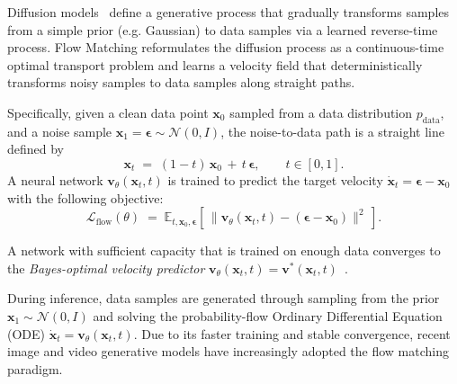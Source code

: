 Diffusion models~\citep{ho2020denoising,song2021score} define a generative process that gradually transforms samples from a simple prior (e.g. Gaussian) to data samples via a learned reverse-time process. Flow Matching \cite{liu2022rectified,lipman2023flow} reformulates the diffusion process as a continuous-time optimal transport problem and learns a velocity field that deterministically transforms noisy samples to data samples along straight paths.

Specifically, given a clean data point $\mathbf{x}_0$ sampled from a data distribution $p_{\text{data}}$, and a noise sample $\mathbf{x}_1 = \boldsymbol{\epsilon} \sim \mathcal{N}(0, I)$, the noise-to-data path is a straight line defined by
\begin{equation}
  \mathbf{x}_t \;=\; (1-t)\, \mathbf{x}_0 \,+\, t\,\boldsymbol{\epsilon},
  \qquad t \in [0, 1].
  \label{eq:flow-forward}
\end{equation}
A neural network
$\mathbf{v}_\theta(\mathbf{x}_t, t)$ is trained to predict the target velocity $\dot{\mathbf{x}}_t = \boldsymbol{\epsilon} - \mathbf{x}_0$ with the following objective:
\begin{equation}
  \mathcal{L}_\text{flow}(\theta) \;=\; \mathbb{E}_{t, \mathbf{x}_0, \boldsymbol{\epsilon}}\!\left[\,\|\mathbf{v}_\theta(\mathbf{x}_t, t) - (\boldsymbol{\epsilon} - \mathbf{x}_0)\|^2\,\right].
  \label{eq:flow-loss}
\end{equation}

A network with sufficient capacity that is trained on enough data converges to the \textit{Bayes-optimal velocity predictor} $\mathbf{v}_\theta(\mathbf{x}_t, t) = \mathbf{v}^*(\mathbf{x}_t, t)$~\citep{liu2022rectified, lipman2023flow}.

During inference, data samples are generated through sampling from the prior $\mathbf{x}_1 \sim \mathcal{N}(0, I)$ and solving the probability-flow Ordinary Differential Equation (ODE) $\dot{\mathbf{x}}_t = \mathbf{v}_\theta(\mathbf{x}_t, t)$. Due to its faster training and stable convergence, recent image and video generative models \cite{flux-2,zimage,sd3,wan} have increasingly adopted the flow matching paradigm.


